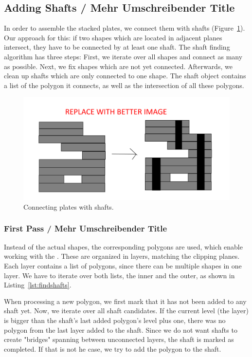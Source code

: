 \documentclass[../ClassicThesis.tex]{subfiles}
\begin{document}
\subsection{Adding Shafts / Mehr Umschreibender Title}

In order to assemble the stacked plates, we connect them with shafts (Figure~\ref{fig:shafts}). Our approach for this: if two shapes which are located in adjacent planes intersect, they have to be connected by at least one shaft. The shaft finding algorithm has three steps: First, we iterate over all shapes and connect as many as possible. Next, we fix shapes which are not yet connected. Afterwards, we clean up shafts which are only connected to one shape. The shaft object contains a list of the polygon it connects, as well as the intersection of all these polygons.

\begin{figure}
    \centering
    \includegraphics[width=1.0\columnwidth]{Images/plates_shafts.png}
    \caption{Connecting plates with shafts.}
    \label{fig:shafts}
\end{figure}

\subsubsection{First Pass / Mehr Umschreibender Title}

Instead of the actual shapes, the corresponding polygons are used, which enable working with the {\jsclipper}. These are organized in layers, matching the clipping planes. Each layer contains a list of polygons, since there can be multiple shapes in one layer. We have to iterate over both lists, the inner and the outer, as shown in Listing~\ref{lst:findshafts}.

When processing a new polygon, we first mark that it has not been added to any shaft yet. Now, we iterate over all shaft candidates. If the current level (the layer) is bigger than the shaft's last added polygon's level plus one, there was no polygon from the last layer added to the shaft. Since we do not want shafts to create "bridges" spanning between unconnected layers, the shaft is marked as completed. If that is not he case, we try to add the polygon to the shaft.
\end{document}
